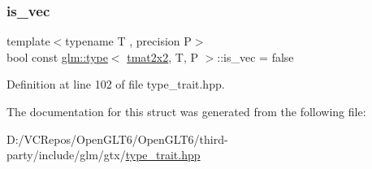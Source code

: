 \subsubsection{\texorpdfstring{is\_vec}{is\_vec}}
{\footnotesize\ttfamily template$<$typename T , precision P$>$ \\
bool const \mbox{\hyperlink{structglm_1_1type}{glm\+::type}}$<$ \mbox{\hyperlink{structglm_1_1tmat2x2}{tmat2x2}}, T, P $>$\+::is\+\_\+vec = false\hspace{0.3cm}{\ttfamily [static]}}



Definition at line 102 of file type\+\_\+trait.\+hpp.



The documentation for this struct was generated from the following file\+:\begin{DoxyCompactItemize}
\item 
D\+:/\+V\+C\+Repos/\+Open\+G\+L\+T6/\+Open\+G\+L\+T6/third-\/party/include/glm/gtx/\mbox{\hyperlink{type__trait_8hpp}{type\+\_\+trait.\+hpp}}\end{DoxyCompactItemize}
